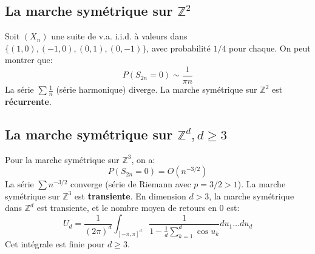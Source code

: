 \subsection{La marche symétrique sur $\mathbb{Z}^2$}
Soit $(X_n)$ une suite de v.a. i.i.d. à valeurs dans $\{(1,0), (-1,0), (0,1), (0,-1)\}$, avec probabilité $1/4$ pour chaque.
On peut montrer que:
\begin{equation*}
    P(S_{2n}=0) \sim \frac{1}{\pi n}
\end{equation*}
La série $\sum \frac{1}{n}$ (série harmonique) diverge. La marche symétrique sur $\mathbb{Z}^2$ est \textbf{récurrente}.
\subsection{La marche symétrique sur $\mathbb{Z}^d, d \ge 3$}
Pour la marche symétrique sur $\mathbb{Z}^3$, on a:
\begin{equation*}
    P(S_{2n}=0) = O(n^{-3/2})
\end{equation*}
La série $\sum n^{-3/2}$ converge (série de Riemann avec $p=3/2 > 1$). La marche symétrique sur $\mathbb{Z}^3$ est \textbf{transiente}.
En dimension $d>3$, la marche symétrique dans $\mathbb{Z}^d$ est transiente, et le nombre moyen de retours en 0 est:
\begin{equation*}
    U_d = \frac{1}{(2\pi)^d} \int_{[-\pi,\pi]^d} \frac{1}{1-\frac{1}{d}\sum_{k=1}^d \cos u_k} d u_1 \dots d u_d
\end{equation*}
Cet intégrale est finie pour $d \ge 3$.